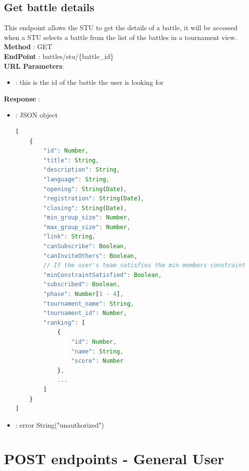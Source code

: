 \subsection*{Get battle details}
This endpoint allows the STU to get the details of a battle, it will be accessed when a STU selects a battle from the list of the battles in a tournament view.\\
\textbf{Method} : GET \\
\textbf{EndPoint} :  battles/stu/\{battle\_id\}\\
\textbf{URL Parameters}:
\begin{itemize}
    \item {} : this is the id of the battle the user is looking for
\end{itemize}
\textbf{Response} : 
    \begin{itemize}
        \item {} : JSON object
        \begin{lstlisting}[language=JavaScript, label={lst:jscode}, basicstyle=\ttfamily]
[
    {
        "id": Number,
        "title": String,
        "description": String,
        "language": String,
        "opening": String(Date),
        "registration": String(Date),
        "closing": String(Date),
        "min_group_size": Number,
        "max_group_size": Number,
        "link": String,
        "canSubscribe": Boolean,
        "canInviteOthers": Boolean,
        // If the user's team satisfies the min members constraint
        "minConstraintSatisfied": Boolean,
        "subscribed": Boolean,
        "phase": Number[1 - 4],
        "tournament_name": String,
        "tournament_id": Number,
        "ranking": [
            {
                "id": Number,
                "name": String,
                "score": Number
            },
            ...
        ]
    }
]
        \end{lstlisting} 
        \item {} : error String("unauthorized")
    \end{itemize}

\section*{POST endpoints - General User}
